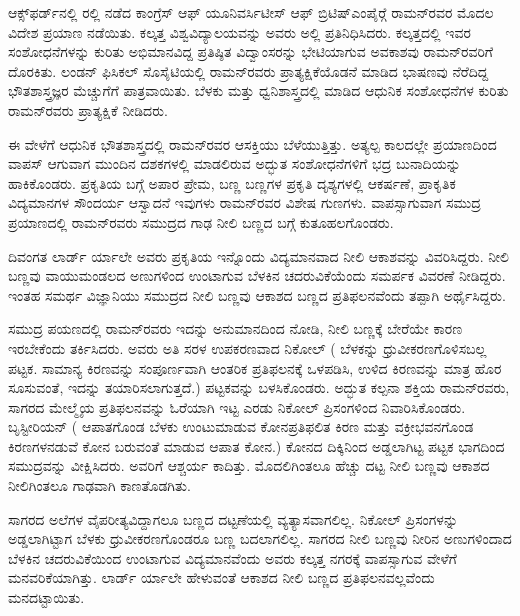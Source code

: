 ಆಕ್ಸ್‌ಫರ್ಡ್‌ನಲ್ಲಿ ರಲ್ಲಿ ನಡೆದ ಕಾಂಗ್ರೆಸ್ ಆಫ್ ಯೂನಿವರ್ಸಿಟೀಸ್ ಆಫ್ ಬ್ರಿಟಿಷ್\break ಎಂಪೈರ್‍ಗೆ ರಾಮನ್‍ರವರ ಮೊದಲ ವಿದೇಶ ಪ್ರಯಾಣ ನಡೆಯಿತು. ಕಲ್ಕತ್ತ ವಿಶ್ವವಿದ್ಯಾಲಯವನ್ನು ಅವರು ಅಲ್ಲಿ ಪ್ರತಿನಿಧಿಸಿದರು. ಕಲ್ಕತ್ತದಲ್ಲಿ ಇವರ ಸಂಶೋಧನೆಗಳನ್ನು ಕುರಿತು ಅಭಿಮಾನವಿದ್ದ ಪ್ರತಿಷ್ಠಿತ ವಿದ್ವಾಂಸರನ್ನು ಭೇಟಿಯಾಗುವ ಅವಕಾಶವು ರಾಮನ್‍ರವರಿಗೆ ದೊರಕಿತು. ಲಂಡನ್ ಫಿಸಿಕಲ್ ಸೊಸೈಟಿಯಲ್ಲಿ ರಾಮನ್‍ರವರು ಪ್ರಾತ್ಯಕ್ಷಿಕೆಯೊಡನೆ ಮಾಡಿದ ಭಾಷಣವು ನೆರೆದಿದ್ದ ಭೌತಶಾಸ್ತ್ರಜ್ಞರ ಮೆಚ್ಚುಗೆಗೆ ಪಾತ್ರವಾಯಿತು. ಬೆಳಕು ಮತ್ತು ಧ್ವನಿಶಾಸ್ತ್ರದಲ್ಲಿ ಮಾಡಿದ ಆಧುನಿಕ ಸಂಶೋ\-ಧನೆಗಳ ಕುರಿತು ರಾಮನ್‍ರವರು ಪ್ರಾತ್ಯಕ್ಷಿಕೆ ನೀಡಿದರು.

ಈ ವೇಳೆಗೆ ಆಧುನಿಕ ಭೌತಶಾಸ್ತ್ರದಲ್ಲಿ ರಾಮನ್‍ರವರ ಆಸಕ್ತಿಯು ಬೆಳೆಯುತ್ತಿತ್ತು. ಅತ್ಯಲ್ಪ ಕಾಲದಲ್ಲೇ ಪ್ರಯಾಣದಿಂದ ವಾಪಸ್ ಆಗುವಾಗ ಮುಂದಿನ ದಶಕಗಳಲ್ಲಿ ಮಾಡಲಿರುವ ಅದ್ಭುತ ಸಂಶೋಧನೆಗಳಿಗೆ ಭದ್ರ ಬುನಾದಿಯನ್ನು ಹಾಕಿಕೊಂಡರು. ಪ್ರಕೃತಿಯ ಬಗ್ಗೆ ಅಪಾರ ಪ್ರೇಮ, ಬಣ್ಣ ಬಣ್ಣಗಳ ಪ್ರಕೃತಿ ದೃಶ್ಯಗಳಲ್ಲಿ ಆಕರ್ಷಣೆ, ಪ್ರಾಕೃತಿಕ ವಿದ್ಯಮಾನಗಳ ಸೌಂದರ್ಯ ಆಸ್ವಾದನೆ \enginline{-} ಇವುಗಳು ರಾಮನ್‍ರವರ ವಿಶೇಷ ಗುಣಗಳು. ವಾಪಸ್ಸಾಗುವಾಗ ಸಮುದ್ರ ಪ್ರಯಾಣದಲ್ಲಿ ರಾಮನ್‍ರವರು ಸಮುದ್ರದ ಗಾಢ ನೀಲಿ ಬಣ್ಣದ ಬಗ್ಗೆ ಕುತೂಹಲಗೊಂಡರು.

ದಿವಂಗತ ಲಾರ್ಡ್ ರ್ಯಾಲೇ ಅವರು ಪ್ರಕೃತಿಯ ಇನ್ನೊಂದು ವಿದ್ಯಮಾನವಾದ ನೀಲಿ ಆಕಾಶವನ್ನು ವಿವರಿಸಿದ್ದರು. ನೀಲಿ ಬಣ್ಣವು ವಾಯುಮಂಡಲದ ಅಣುಗಳಿಂದ ಉಂಟಾಗುವ ಬೆಳಕಿನ ಚದರುವಿಕೆಯೆಂದು ಸಮರ್ಪಕ ವಿವರಣೆ ನೀಡಿದ್ದರು. ಇಂತಹ ಸಮರ್ಥ ವಿಜ್ಞಾನಿಯು ಸಮುದ್ರದ ನೀಲಿ ಬಣ್ಣವು ಆಕಾಶದ ಬಣ್ಣದ ಪ್ರತಿಫಲನವೆಂದು ತಪ್ಪಾಗಿ ಅರ್ಥೈಸಿದ್ದರು.

ಸಮುದ್ರ ಪಯಣದಲ್ಲಿ ರಾಮನ್‍ರವರು ಇದನ್ನು ಅನುಮಾನದಿಂದ ನೋಡಿ, ನೀಲಿ ಬಣ್ಣಕ್ಕೆ ಬೇರೆಯೇ ಕಾರಣ ಇರಬೇಕೆಂದು ತರ್ಕಿಸಿದರು. ಅವರು ಅತಿ ಸರಳ ಉಪಕರಣವಾದ ನಿಕೋಲ್ ( ಬೆಳಕನ್ನು ಧ್ರುವೀಕರಣಗೊಳಿಸಬಲ್ಲ ಪಟ್ಟಕ. ಸಾಮಾನ್ಯ ಕಿರಣವನ್ನು ಸಂಪೂರ್ಣವಾಗಿ ಆಂತರಿಕ ಪ್ರತಿಫಲನಕ್ಕೆ ಒಳಪಡಿಸಿ, ಉಳಿದ ಕಿರಣವನ್ನು ಮಾತ್ರ ಹೊರ ಸೂಸುವಂತೆ, ಇದನ್ನು ತಯಾರಿಸಲಾಗುತ್ತದೆ.) ಪಟ್ಟಕವನ್ನು ಬಳಸಿಕೊಂಡರು. ಅದ್ಭುತ ಕಲ್ಪನಾ ಶಕ್ತಿಯ ರಾಮನ್‍ರವರು, ಸಾಗರದ ಮೇಲ್ಮೈಯ ಪ್ರತಿಫಲನವನ್ನು ಓರೆಯಾಗಿ ಇಟ್ಟ ಎರಡು ನಿಕೋಲ್ ಪ್ರಿಸಂಗಳಿಂದ ನಿವಾರಿಸಿಕೊಂಡರು. ಬೃಸ್ಟೀರಿಯನ್ ( ಆಪಾತಗೊಂಡ ಬೆಳಕು ಉಂಟುಮಾಡುವ ಕೋನ\enginline{-}ಪ್ರತಿಫಲಿತ ಕಿರಣ ಮತ್ತು ವಕ್ರೀಭವನಗೊಂಡ ಕಿರಣಗಳನಡುವೆ ಕೋನ ಬರುವಂತೆ ಮಾಡುವ ಆಪಾತ ಕೋನ.) ಕೋನದ ದಿಕ್ಕಿನಿಂದ ಅಡ್ಡಲಾಗಿಟ್ಟ ಪಟ್ಟಕ ಭಾಗದಿಂದ ಸಮುದ್ರವನ್ನು ವೀಕ್ಷಿಸಿದರು. ಅವರಿಗೆ ಆಶ್ಚರ್ಯ ಕಾದಿತ್ತು. ಮೊದಲಿಗಿಂತಲೂ ಹೆಚ್ಚು ದಟ್ಟ ನೀಲಿ ಬಣ್ಣವು ಆಕಾಶದ ನೀಲಿಗಿಂತಲೂ ಗಾಢವಾಗಿ ಕಾಣತೊಡಗಿತು. 

\newpage

ಸಾಗರದ ಅಲೆಗಳ ವೈಪರೀತ್ಯವಿದ್ದಾಗಲೂ ಬಣ್ಣದ ದಟ್ಟಣೆಯಲ್ಲಿ ವ್ಯತ್ಯಾಸವಾಗಲಿಲ್ಲ. ನಿಕೋಲ್ ಪ್ರಿಸಂಗಳನ್ನು ಅಡ್ಡಲಾಗಿಟ್ಟಾಗ ಬೆಳಕು ಧ್ರುವೀಕರಣಗೊಂಡರೂ ಬಣ್ಣ ಬದಲಾಗಲಿಲ್ಲ. ಸಾಗರದ ನೀಲಿ ಬಣ್ಣವು ನೀರಿನ ಅಣುಗಳಿಂದಾದ ಬೆಳಕಿನ ಚದರುವಿಕೆಯಿಂದ ಉಂಟಾಗುವ ವಿದ್ಯಮಾನವೆಂದು ಅವರು ಕಲ್ಕತ್ತ ನಗರಕ್ಕೆ ವಾಪಸ್ಸಾಗುವ ವೇಳೆಗೆ ಮನವರಿಕೆಯಾಗಿತ್ತು. ಲಾರ್ಡ್ ರ್ಯಾಲೇ ಹೇಳುವಂತೆ ಆಕಾಶದ ನೀಲಿ ಬಣ್ಣದ ಪ್ರತಿಫಲನವಲ್ಲವೆಂದು ಮನದಟ್ಟಾಯಿತು.

\vskip 2pt

